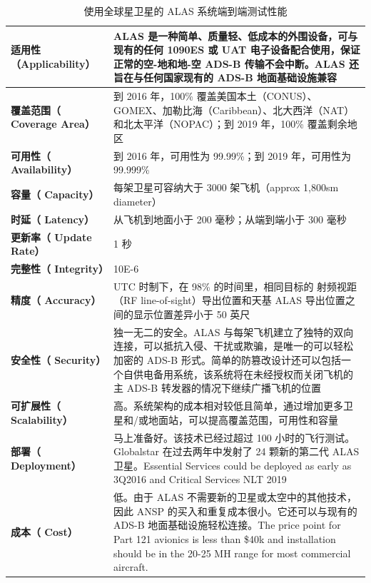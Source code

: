 \renewcommand\arraystretch{1.5}
\begin{table}[htbp]
\centering
\caption{使用全球星卫星的 ALAS 系统端到端测试性能}
\label{tab:alas-paras}
\begin{tabular}[b]{|p{4cm}<{\raggedleft}|p{11cm}<{\raggedright}|}
\hline
\textbf{适用性
（Applicability）} &
ALAS 是一种简单、质量轻、低成本的外围设备，可与现有的任何 1090ES 或 UAT 电子设备配合使用，保证正常的空-地和地-空 ADS-B 传输不会中断。ALAS 还旨在与任何国家现有的 ADS-B 地面基础设施兼容\\
\hline
\textbf{覆盖范围（
Coverage Area）} &
到 2016 年，100\% 覆盖美国本土（CONUS）、GOMEX、加勒比海（Caribbean）、北大西洋（NAT）和北太平洋（NOPAC）；到 2019 年，100\% 覆盖剩余地区\\
\hline
\textbf{可用性（
Availability）} & 到 2016 年，可用性为 99.99\%；到 2019 年，可用性为 99.999\% \\
\hline
\textbf{容量（
Capacity） }& 每架卫星可容纳大于 3000 架飞机（approx 1,800sm diameter）\\
\hline
\textbf{时延（
Latency）} &  从飞机到地面小于 200 毫秒；从端到端小于 300 毫秒 \\
\hline
\textbf{更新率（
Update Rate）} & 1 秒 \\
\hline
\textbf{完整性（
Integrity）} & 10E-6 \\
\hline
\textbf{精度（
Accuracy）} &
UTC 时制下，在 98\% 的时间里，相同目标的 射频视距（RF line-of-sight）导出位置和天基 ALAS 导出位置之间的显示位置差异小于 50 英尺\\
\hline
\textbf{安全性（
Security）} & 独一无二的安全。ALAS 与每架飞机建立了独特的双向连接，可以抵抗入侵、干扰或欺骗，是唯一的可以轻松加密的 ADS-B 形式。简单的防篡改设计还可以包括一个自供电备用系统，该系统将在未经授权而关闭飞机的主 ADS-B 转发器的情况下继续广播飞机的位置 \\
\hline
\textbf{可扩展性（
Scalability）}  & 高。系统架构的成本相对较低且简单，通过增加更多卫星和/或地面站，可以提高覆盖范围，可用性和容量 \\
\hline
\textbf{部署（
Deployment）} & 马上准备好。该技术已经过超过 100 小时的飞行测试。Globalstar 在过去两年中发射了 24 颗新的第二代 ALAS 卫星。Essential Services could be deployed as early as 3Q2016 and Critical Services NLT 2019\\
\hline
\textbf{成本（
Cost）} & 低。由于 ALAS 不需要新的卫星或太空中的其他技术，因此 ANSP 的买入和重复成本很小。它还可以与现有的 ADS-B 地面基础设施轻松连接。The price point for Part 121 avionics is less than \$40k and installation should be in the 20-25 MH range for most commercial aircraft. \\
\hline
\end{tabular}

\end{table}
